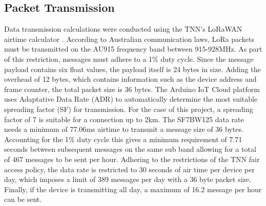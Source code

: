 \subsection{Packet Transmission}
Data transmission calculations were conducted using the TNN's LoRaWAN airtime calculator \cite{airtime-calc}. According to Australian communication laws, LoRa packets must be transmitted on the AU915 frequency band between 915-928MHz. As part of this restriction, messages must adhere to a 1\% duty cycle. Since the message payload contains six float values, the payload itself is 24 bytes in size. Adding the overhead of 12 bytes, which contains information such as the device address and frame counter, the total packet size is 36 bytes. The Arduino IoT Cloud platform uses Adaptative Data Rate (ADR) to automatically determine the most suitable spreading factor (SF) for transmission. For the case of this project, a spreading factor of 7 is suitable for a connection up to 2km. The SF7BW125 data rate needs a minimum of 77.06ms airtime to transmit a message size of 36 bytes. Accounting for the 1\% duty cycle this gives a minimum requirement of 7.71 seconds between subsequent messages on the same sub band allowing for a total of 467 messages to be sent per hour. Adhering to the restrictions of the TNN fair access policy, the data rate is restricted to 30 seconds of air time per device per day, which imposes a limit of 389 messages per day with a 36 byte packet size. Finally, if the device is transmitting all day, a maximum of 16.2 message per hour can be sent. 









